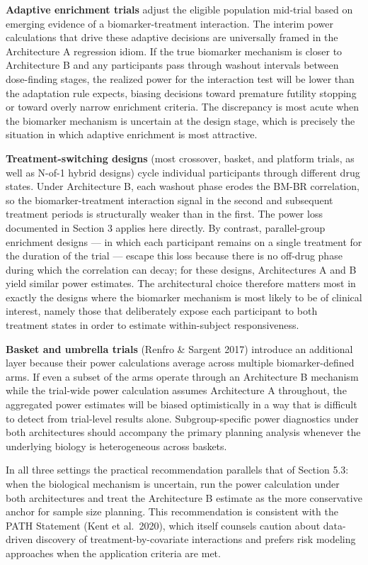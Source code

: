 \documentclass[
]{article}
\begin{document}
\textbf{Adaptive enrichment trials} adjust the eligible
population mid-trial based on emerging evidence of a
biomarker-treatment interaction. The interim power calculations
that drive these adaptive decisions are universally framed in
the Architecture A regression idiom. If the true biomarker
mechanism is closer to Architecture B and any participants pass
through washout intervals between dose-finding stages, the
realized power for the interaction test will be lower than the
adaptation rule expects, biasing decisions toward premature
futility stopping or toward overly narrow enrichment criteria.
The discrepancy is most acute when the biomarker mechanism is
uncertain at the design stage, which is precisely the situation
in which adaptive enrichment is most attractive.

\textbf{Treatment-switching designs} (most crossover, basket,
and platform trials, as well as N-of-1 hybrid designs) cycle
individual participants through different drug states. Under
Architecture B, each washout phase erodes the BM-BR correlation,
so the biomarker-treatment interaction signal in the second and
subsequent treatment periods is structurally weaker than in the
first. The power loss documented in Section 3 applies here
directly. By contrast, parallel-group enrichment designs --- in
which each participant remains on a single treatment for the
duration of the trial --- escape this loss because there is no
off-drug phase during which the correlation can decay; for
these designs, Architectures A and B yield similar power
estimates. The architectural choice therefore matters most in
exactly the designs where the biomarker mechanism is most
likely to be of clinical interest, namely those that
deliberately expose each participant to both treatment states
in order to estimate within-subject responsiveness.

\textbf{Basket and umbrella trials} (Renfro \& Sargent 2017)
introduce an additional layer because their power calculations
average across multiple biomarker-defined arms. If even a
subset of the arms operate through an Architecture B
mechanism while the trial-wide power calculation assumes
Architecture A throughout, the aggregated power estimates will
be biased optimistically in a way that is difficult to detect
from trial-level results alone. Subgroup-specific power
diagnostics under both architectures should accompany the
primary planning analysis whenever the underlying biology is
heterogeneous across baskets.

In all three settings the practical recommendation parallels
that of Section 5.3: when the biological mechanism is uncertain,
run the power calculation under both architectures and treat
the Architecture B estimate as the more conservative anchor for
sample size planning. This recommendation is consistent with
the PATH Statement (Kent et al.~2020), which itself counsels
caution about data-driven discovery of treatment-by-covariate
interactions and prefers risk modeling approaches when the
application criteria are met.
\end{document}
